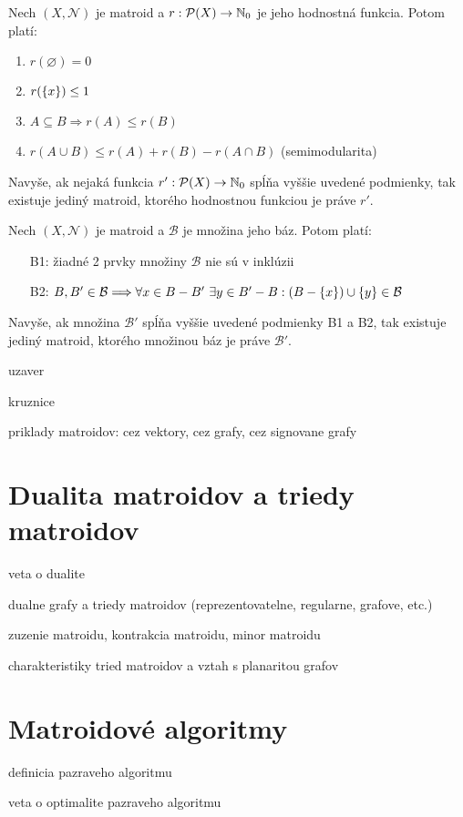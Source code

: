 \begin{theorem}
Nech $(X, \mathcal{N})$ je matroid a $r:\mathcal{P}(X) \to \mathbb{N}_0$ je jeho hodnostná funkcia. Potom platí:
\begin{enumerate}
    \item $r(\varnothing) = 0$
    \item $r(\left\{x\right\}) \leq 1$
    \item $A \subseteq B \Longrightarrow r(A) \leq r(B)$
    \item $r(A \cup B) \leq r(A) + r(B) - r(A \cap B)$ (semimodularita)
\end{enumerate}

Navyše, ak nejaká funkcia $r':\mathcal{P}(X)\to\mathbb{N}_0$ spĺňa vyššie uvedené podmienky, tak existuje jediný matroid, ktorého
hodnostnou funkciou je práve $r'$.

\end{theorem}

\begin{theorem}
Nech $(X, \mathcal{N})$ je matroid a $\mathcal{B}$ je množina jeho báz. Potom platí:
\begin{enumerate}
    \item[B1:] žiadné 2 prvky množiny $\mathcal{B}$ nie sú v inklúzii
    \item[B2:] $B, B' \in \mathcal{B} \Longrightarrow \forall x \in B - B' ~\exists y \in B' - B: (B-\left\{x\right\}) \cup \left\{y\right\} \in \mathcal{B}$
\end{enumerate}

Navyše, ak množina $\mathcal{B}'$ spĺňa vyššie uvedené podmienky B1 a B2, tak existuje jediný matroid, ktorého množinou báz je práve $\mathcal{B}'$.
\end{theorem}

\TODO uzaver

\TODO kruznice

\TODO priklady matroidov: cez vektory, cez grafy, cez signovane grafy

\section{Dualita matroidov a triedy matroidov}

\TODO veta o dualite

\TODO dualne grafy a triedy matroidov (reprezentovatelne, regularne, grafove, etc.)

\TODO zuzenie matroidu, kontrakcia matroidu, minor matroidu

\TODO charakteristiky tried matroidov a vztah s planaritou grafov



\section{Matroidové algoritmy}

\TODO definicia pazraveho algoritmu

\TODO veta o optimalite pazraveho algoritmu
